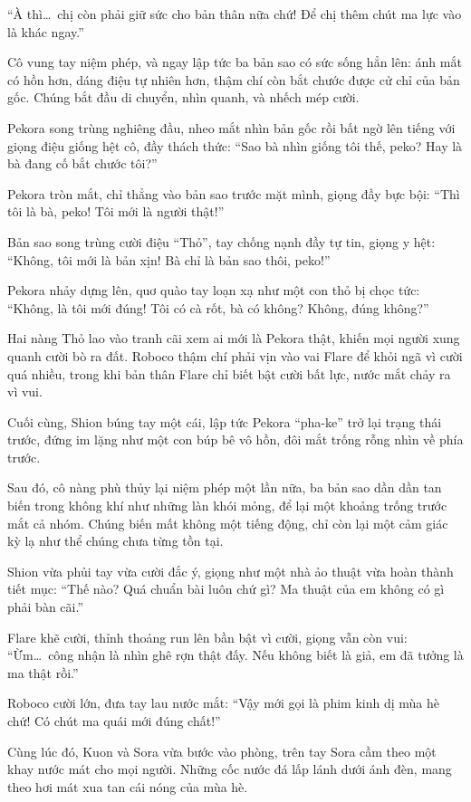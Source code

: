 \documentclass[../main.tex]{subfiles}
\begin{document}
``À thì\dots\ chị còn phải giữ sức cho bản thân nữa chứ! Để chị thêm chút ma lực vào là khác ngay.''

Cô vung tay niệm phép, và ngay lập tức ba bản sao có sức sống hẳn lên: ánh mắt có hồn hơn, dáng điệu tự nhiên hơn, thậm chí còn bắt chước được cử chỉ của bản gốc. Chúng bắt đầu di chuyển, nhìn quanh, và nhếch mép cười.

Pekora song trùng nghiêng đầu, nheo mắt nhìn bản gốc rồi bất ngờ lên tiếng với giọng điệu giống hệt cô, đầy thách thức: ``Sao bà nhìn giống tôi thế, peko? Hay là bà đang cố bắt chước tôi?''

Pekora tròn mắt, chỉ thẳng vào bản sao trước mặt mình, giọng đầy bực bội: ``Thì tôi là bà, peko! Tôi mới là người thật!''

Bản sao song trùng cười điệu ``Thỏ'', tay chống nạnh đầy tự tin, giọng y hệt: ``Không, tôi mới là bản xịn! Bà chỉ là bản sao thôi, peko!''

Pekora nhảy dựng lên, quơ quào tay loạn xạ như một con thỏ bị chọc tức: ``Không, là tôi mới đúng! Tôi có cà rốt, bà có không? Không, đúng không?''

Hai nàng Thỏ lao vào tranh cãi xem ai mới là Pekora thật, khiến mọi người xung quanh cười bò ra đất. Roboco thậm chí phải vịn vào vai Flare để khỏi ngã vì cười quá nhiều, trong khi bản thân Flare chỉ biết bật cười bất lực, nước mắt chảy ra vì vui.

Cuối cùng, Shion búng tay một cái, lập tức Pekora ``pha-ke'' trở lại trạng thái trước, đứng im lặng như một con búp bê vô hồn, đôi mắt trống rỗng nhìn về phía trước.

Sau đó, cô nàng phù thủy lại niệm phép một lần nữa, ba bản sao dần dần tan biến trong không khí như những làn khói mỏng, để lại một khoảng trống trước mắt cả nhóm. Chúng biến mất không một tiếng động, chỉ còn lại một cảm giác kỳ lạ như thể chúng chưa từng tồn tại.

Shion vừa phủi tay vừa cười đắc ý, giọng như một nhà ảo thuật vừa hoàn thành tiết mục: ``Thế nào? Quá chuẩn bài luôn chứ gì? Ma thuật của em không có gì phải bàn cãi.''

Flare khẽ cười, thỉnh thoảng run lên bần bật vì cười, giọng vẫn còn vui: ``Ừm\dots\ công nhận là nhìn ghê rợn thật đấy. Nếu không biết là giả, em đã tưởng là ma thật rồi.''

Roboco cười lớn, đưa tay lau nước mắt: ``Vậy mới gọi là phim kinh dị mùa hè chứ! Có chút ma quái mới đúng chất!''

Cùng lúc đó, Kuon và Sora vừa bước vào phòng, trên tay Sora cầm theo một khay nước mát cho mọi người. Những cốc nước đá lấp lánh dưới ánh đèn, mang theo hơi mát xua tan cái nóng của mùa hè.
\end{document}

